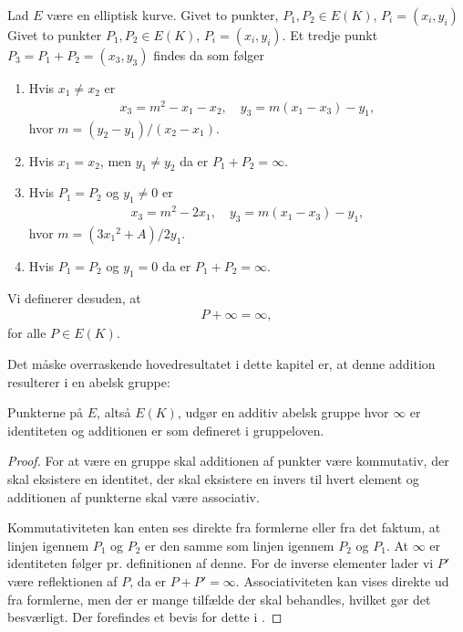 \begin{definition}[Gruppeloven]
Lad $E$ være en elliptisk kurve. Givet to punkter, $P_1, P_2 \in E(K)$, $P_i = (x_i, y_i)$
Givet to punkter $P_1, P_2 \in E(K)$, $P_i = (x_i, y_i)$. Et tredje punkt
$P_3 = P_1 + P_2 = (x_3, y_3)$ findes da som følger
\begin{enumerate}
	\item Hvis $x_1 \neq x_2$ er 
	\begin{align*}
		x_3 = m^2 - x_1 - x_2, \quad y_3 = m(x_1 - x_3) - y_1,
	\end{align*}		
	hvor $m = (y_2 - y_1)/(x_2 - x_1)$.
	\item Hvis $x_1 = x_2$, men $y_1 \neq y_2$ da er $P_1 + P_2 = \infty$.
	\item Hvis $P_1 = P_2$ og $y_1 \neq 0$ er 
	\begin{align*}
		x_3 = m^2 - 2x_1, \quad y_3=m(x_1 - x_3) - y_1,
	\end{align*}
	hvor $m=(3{x_1}^2 + A)/2y_1$.
	\item Hvis $P_1 = P_2$ og $y_1 = 0$ da er $P_1 + P_2 = \infty$.
\end{enumerate}
Vi definerer desuden, at 
\begin{align*}
	P + \infty = \infty,
\end{align*}
for alle $P \in E(K)$.
\end{definition}

Det måske overraskende hovedresultatet i dette kapitel er, at denne addition resulterer i en abelsk gruppe:

\begin{theorem}
Punkterne på $E$, altså $E(K)$, udgør en additiv abelsk gruppe hvor $\infty$ er identiteten og additionen er som defineret i gruppeloven. 
\end{theorem}
\begin{proof}
For at være en gruppe skal additionen af punkter være kommutativ, der skal eksistere en identitet, der skal eksistere en invers til hvert element og additionen af punkterne skal være associativ.

Kommutativiteten kan enten ses direkte fra formlerne eller fra det faktum, at linjen igennem $P_1$ og $P_2$ er den samme som linjen igennem $P_2$ og $P_1$. At $\infty$ er identiteten følger pr. definitionen af denne. For de inverse elementer lader vi $P'$ være reflektionen af $P$, da er $P+P' = \infty$. Associativiteten kan vises direkte ud fra formlerne, men der er mange tilfælde der skal behandles, hvilket gør det besværligt. Der forefindes et bevis for dette i \cite[afsnit~2.4]{Washington}.
\end{proof}